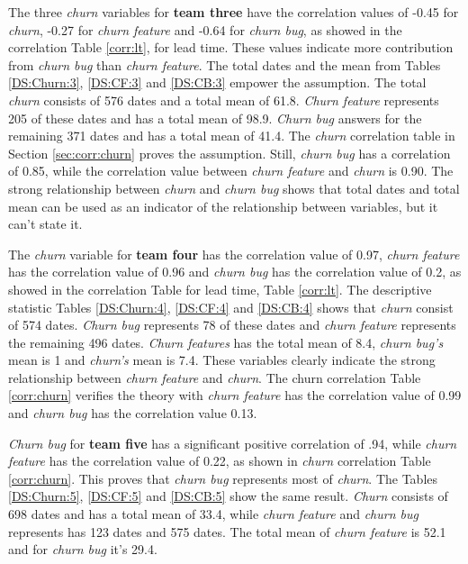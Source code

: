 \documentclass[UKenglish]{ifimaster}  %
\begin{document}
The three \textit{churn} variables for \textbf{team three} have the correlation values of -0.45 for \textit{churn}, -0.27 for \textit{churn feature} and -0.64 for \textit{churn bug}, as showed in the correlation Table \ref{corr:lt}, for lead time. These values indicate more contribution from \textit{churn bug}  than \textit{churn feature}. The total dates and the mean from Tables \ref{DS:Churn:3}, \ref{DS:CF:3} and \ref{DS:CB:3} empower the assumption. The total \textit{churn} consists of 576 dates and a total mean of 61.8. \textit{Churn feature}  represents 205 of these dates and has a total mean of 98.9. \textit{Churn bug} answers for the remaining 371 dates and has a total mean of 41.4. The \textit{churn} correlation table in Section \ref{sec:corr:churn} proves the assumption. Still,  \textit{churn bug} has a correlation of 0.85, while the correlation value between \textit{churn feature} and \textit{churn} is 0.90. The strong relationship between \textit{churn} and \textit{churn bug} shows that total dates and total mean can be used as an indicator of the relationship between variables, but it can't state it.


The \textit{churn} variable for \textbf{team four} has the correlation value of 0.97, \textit{churn feature} has the correlation value of 0.96 and  \textit{churn bug} has the correlation value of 0.2, as showed in the correlation Table for lead time, Table \ref{corr:lt}. The descriptive statistic Tables \ref{DS:Churn:4}, \ref{DS:CF:4} and \ref{DS:CB:4} shows that \textit{churn} consist of 574 dates. \textit{Churn bug} represents 78 of these dates and \textit{churn feature} represents the remaining 496 dates. \textit{Churn features} has the total mean of 8.4, \textit{churn bug's} mean is 1 and \textit{churn's} mean is 7.4. These variables clearly indicate the strong relationship between \textit{churn feature} and \textit{churn}. The churn correlation Table \ref{corr:churn} verifies the theory with \textit{churn feature} has the correlation value of 0.99 and \textit{churn bug} has the correlation value 0.13.

\textit{Churn bug} for \textbf{team five} has a significant positive correlation of .94, while \textit{churn feature} has the correlation value of 0.22, as shown in \textit{churn} correlation Table \ref{corr:churn}. This proves that \textit{churn bug} represents most of \textit{churn}. The Tables \ref{DS:Churn:5}, \ref{DS:CF:5} and \ref{DS:CB:5} show the same result. \textit{Churn} consists of 698 dates and has a total mean of 33.4, while \textit{churn feature} and \textit{churn bug} represents has 123 dates and 575 dates. The total mean of \textit{churn feature} is 52.1 and for \textit{churn bug} it's 29.4. 
\end{document}
